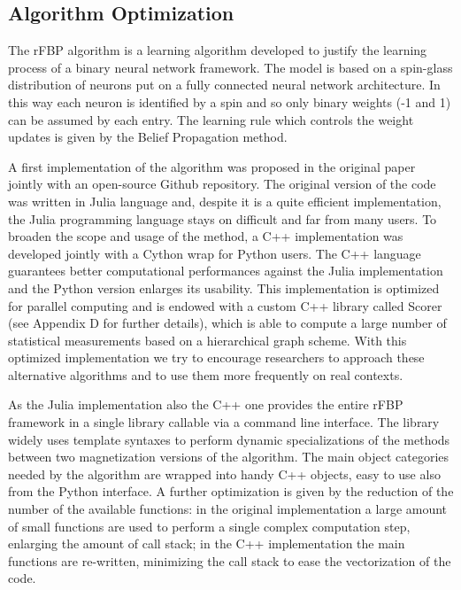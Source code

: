 \documentclass{standalone}
\begin{document}
\subsection[Algorithm Optimization]{Algorithm Optimization}\label{rfbp:rFBP}

The rFBP algorithm is a learning algorithm developed to justify the learning process of a binary neural network framework.
The model is based on a spin-glass distribution of neurons put on a fully connected neural network architecture.
In this way each neuron is identified by a spin and so only binary weights (-1 and 1) can be assumed by each entry.
The learning rule which controls the weight updates is given by the Belief Propagation method.

A first implementation of the algorithm was proposed in the original paper~\cite{BaldassiE7655} jointly with an open-source Github repository.
The original version of the code was written in \textsf{Julia} language and, despite it is a quite efficient implementation, the \textsf{Julia} programming language stays on difficult and far from many users.
To broaden the scope and usage of the method, a \textsf{C++} implementation was developed jointly with a \textsf{Cython} wrap for \textsf{Python} users.
The \textsf{C++} language guarantees better computational performances against the \textsf{Julia} implementation and the \textsf{Python} version enlarges its usability.
This implementation is optimized for parallel computing and is endowed with a custom \textsf{C++} library called \textsf{Scorer} (see Appendix D for further details), which is able to compute a large number of statistical measurements based on a hierarchical graph scheme.
With this optimized implementation we try to encourage researchers to approach these alternative algorithms and to use them more frequently on real contexts.

As the \textsf{Julia} implementation also the \textsf{C++} one provides the entire rFBP framework in a single library callable via a command line interface.
The library widely uses template syntaxes to perform dynamic specializations of the methods between two magnetization versions of the algorithm.
The main object categories needed by the algorithm are wrapped into handy \textsf{C++} objects, easy to use also from the \textsf{Python} interface.
A further optimization is given by the reduction of the number of the available functions: in the original implementation a large amount of small functions are used to perform a single complex computation step, enlarging the amount of call stack; in the \textsf{C++} implementation the main functions are re-written, minimizing the call stack to ease the vectorization of the code.
\end{document}
